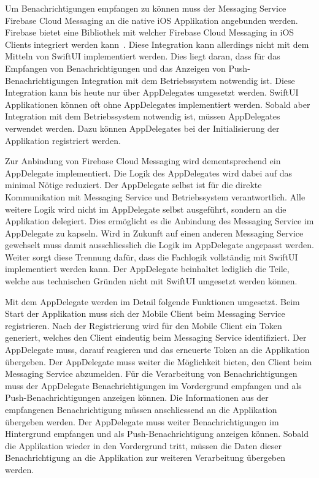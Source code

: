 Um Benachrichtigungen empfangen zu können muss der Messaging Service Firebase Cloud Messaging an die native iOS Applikation angebunden werden.
Firebase bietet eine Bibliothek mit welcher Firebase Cloud Messaging in iOS Clients integriert werden kann~\cite{firebase_ios}.
Diese Integration kann allerdings nicht mit dem Mitteln von SwiftUI implementiert werden.
Dies liegt daran, dass für das Empfangen von Benachrichtigungen und das Anzeigen von Push-Benachrichtigungen Integration mit dem Betriebssystem notwendig ist.
Diese Integration kann bis heute nur über AppDelegates umgesetzt werden.
SwiftUI Applikationen können oft ohne AppDelegates implementiert werden.
Sobald aber Integration mit dem Betriebssystem notwendig ist, müssen AppDelegates verwendet werden.
Dazu können AppDelegates bei der Initialisierung der Applikation registriert werden.

Zur Anbindung von Firebase Cloud Messaging wird dementsprechend ein AppDelegate implementiert.
Die Logik des AppDelegates wird dabei auf das minimal Nötige reduziert.
Der AppDelegate selbst ist für die direkte Kommunikation mit Messaging Service und Betriebssystem verantwortlich.
Alle weitere Logik wird nicht im AppDelegate selbst ausgeführt, sondern an die Applikation delegiert.
Dies ermöglicht es die Anbindung des Messaging Service im AppDelegate zu kapseln.
Wird in Zukunft auf einen anderen Messaging Service gewchselt muss damit ausschliesslich die Logik im AppDelegate angepasst werden.
Weiter sorgt diese Trennung dafür, dass die Fachlogik vollständig mit SwiftUI implementiert werden kann.
Der AppDelegate beinhaltet lediglich die Teile, welche aus technischen Gründen nicht mit SwiftUI umgesetzt werden können.

Mit dem AppDelegate werden im Detail folgende Funktionen umgesetzt.
Beim Start der Applikation muss sich der Mobile Client beim Messaging Service registrieren.
Nach der Registrierung wird für den Mobile Client ein Token generiert, welches den Client eindeutig beim Messaging Service identifiziert.
Der AppDelegate muss, darauf reagieren und das erneuerte Token an die Applikation übergeben.
Der AppDelegate muss weiter die Möglichkeit bieten, den Client beim Messaging Service abzumelden.
Für die Verarbeitung von Benachrichtigungen muss der AppDelegate Benachrichtigungen im Vordergrund empfangen und als Push-Benachrichtigungen anzeigen können.
Die Informationen aus der empfangenen Benachrichtigung müssen anschliessend an die Applikation übergeben werden.
Der AppDelegate muss weiter Benachrichtigungen im Hintergrund empfangen und als Push-Benachrichtigung anzeigen können.
Sobald die Applikation wieder in den Vordergrund tritt, müssen die Daten dieser Benachrichtigung an die Applikation zur weiteren Verarbeitung übergeben werden.

